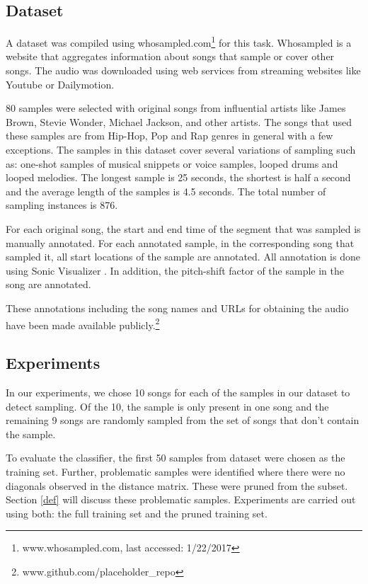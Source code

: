 \documentclass{article}
\begin{document}
\subsection{Dataset}
A dataset was compiled using whosampled.com\footnote{www.whosampled.com, last accessed: 1/22/2017} for this task. Whosampled is a website that aggregates information about songs that sample or cover other songs. The audio was downloaded using web services from streaming websites like Youtube or Dailymotion.

80 samples were selected with original songs from influential artists like James Brown, Stevie Wonder, Michael Jackson, and other artists. The songs that used these samples are from Hip-Hop, Pop and Rap genres in general with a few exceptions. The samples in this dataset cover several variations of sampling such as: one-shot samples of musical snippets or voice samples, looped drums and looped melodies. The longest sample is 25 seconds, the shortest is half a second and the average length of the samples is 4.5 seconds. The total number of sampling instances is 876.

For each original song, the start and end time of the segment that was sampled is manually annotated. For each annotated sample, in the corresponding song that sampled it, all start locations of the sample are annotated. All annotation is done using Sonic Visualizer \cite{SonicVisualiser}. In addition, the pitch-shift factor of the sample in the song are annotated.

These annotations including the song names and URLs for obtaining the audio have been made available publicly.\footnote{www.github.com/placeholder\_repo}

\subsection{Experiments}

In our experiments, we chose 10 songs for each of the samples in our dataset to detect sampling. Of the 10, the sample is only present in one song and the remaining 9 songs are randomly sampled from the set of songs that don't contain the sample.

To evaluate the classifier, the first 50 samples from dataset were chosen as the training set. Further, problematic samples were identified where there were no diagonals observed in the distance matrix. These were pruned from the subset. Section \ref{def} will discuss these problematic samples. Experiments are carried out using both: the full training set and the pruned training set.
\end{document}
